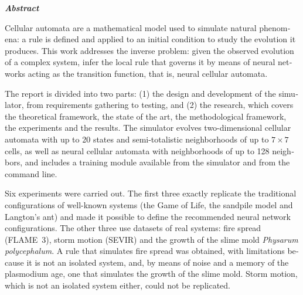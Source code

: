 \thispagestyle{empty}

\vspace*{1cm}
{\centering \Large \textbf{\textit{Abstract}}\par}
\vspace{0.8cm}

\begin{otherlanguage}{english}
Cellular automata are a mathematical model used to simulate natural phenomena: a rule is defined and applied to an initial condition to study the evolution it produces. This work addresses the inverse problem: given the observed evolution of a complex system, infer the local rule that governs it by means of neural networks acting as the transition function, that is, neural cellular automata.

The report is divided into two parts: (1) the design and development of the simulator, from requirements gathering to testing, and (2) the research, which covers the theoretical framework, the state of the art, the methodological framework, the experiments and the results. The simulator evolves two-dimensional cellular automata with up to 20 states and semi-totalistic neighborhoods of up to $7 \times 7$ cells, as well as neural cellular automata with neighborhoods of up to 128 neighbors, and includes a training module available from the simulator and from the command line.

Six experiments were carried out. The first three exactly replicate the traditional configurations of well-known systems (the Game of Life, the sandpile model and Langton's ant) and made it possible to define the recommended neural network configurations. The other three use datasets of real systems: fire spread (FLAME~3), storm motion (SEVIR) and the growth of the slime mold \textit{Physarum polycephalum}. A rule that simulates fire spread was obtained, with limitations because it is not an isolated system, and, by means of noise and a memory of the plasmodium age, one that simulates the growth of the slime mold. Storm motion, which is not an isolated system either, could not be replicated.
\end{otherlanguage}

\clearpage
